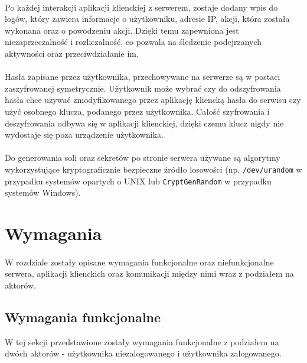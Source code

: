 \documentclass{article}
\begin{document}
    \paragraph{}Po każdej interakcji aplikacji klienckiej z serwerem, zostaje dodany wpis do logów, który zawiera informacje o użytkowniku, adresie IP, akcji, która została wykonana oraz o powodzeniu akcji. Dzięki temu zapewniona jest niezaprzeczalność i rozliczalność, co pozwala na śledzenie podejrzanych aktywności oraz przeciwdziałanie im.

    \paragraph{}Hasła zapisane przez użytkownika, przechowywane na serwerze są w postaci zaszyfrowanej symetrycznie. Użytkownik może wybrać czy do odszyfrowania hasła chce używać zmodyfikowanego przez aplikację kliencką hasła do serwisu czy użyć osobnego klucza, podanego przez użytkownika. Całość szyfrowania i deszyfrowania odbywa się w aplikacji klienckiej, dzięki czemu klucz nigdy nie wydostaje się poza urządzenie użytkownika.

    \paragraph{}Do generowania soli oraz sekretów po stronie serwera używane są algorytmy wykorzystujące kryptograficznie bezpieczne źródło losowości (np. \texttt{/dev/urandom} w przypadku systemów opartych o UNIX lub \texttt{CryptGenRandom} w przypadku systemów Windows).





    \section{Wymagania}
    \paragraph{}W rozdziale zostały opisane wymagania funkcjonalne oraz niefunkcjonalne serwera, aplikacji klienckich oraz komunikacji między nimi wraz z podziałem na aktorów.

    \subsection{Wymagania funkcjonalne}
    W tej sekcji przedstawione zostały wymagania funkcjonalne z podziałem na dwóch aktorów - użytkownika niezalogowanego i użytkownika zalogowanego.
\end{document}
